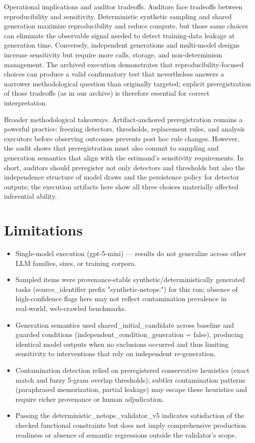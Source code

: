 \documentclass[conference]{IEEEtran}
\begin{document}
Operational implications and auditor tradeoffs. Auditors face tradeoffs between reproducibility and sensitivity. Deterministic synthetic sampling and shared generation maximize reproducibility and reduce compute, but those same choices can eliminate the observable signal needed to detect training‑data leakage at generation time. Conversely, independent generations and multi‑model designs increase sensitivity but require more calls, storage, and non‑determinism management. The archived execution demonstrates that reproducibility‑focused choices can produce a valid confirmatory test that nevertheless answers a narrower methodological question than originally targeted; explicit preregistration of those tradeoffs (as in our archive) is therefore essential for correct interpretation.

Broader methodological takeaways. Artifact‑anchored preregistration remains a powerful practice: freezing detectors, thresholds, replacement rules, and analysis executors before observing outcomes prevents post hoc rule changes. However, the audit shows that preregistration must also commit to sampling and generation semantics that align with the estimand's sensitivity requirements. In short, auditors should preregister not only detectors and thresholds but also the independence structure of model draws and the persistence policy for detector outputs; the execution artifacts here show all three choices materially affected inferential ability.

\section{Limitations}
\begin{itemize}
\item Single‑model execution (gpt‑5-mini) --- results do not generalize across other LLM families, sizes, or training corpora.
\item Sampled items were provenance‑stable synthetic/deterministically generated tasks (source\_identifier prefix "synthetic-netops:") for this run; absence of high‑confidence flags here may not reflect contamination prevalence in real‑world, web‑crawled benchmarks.
\item Generation semantics used shared\_initial\_candidate across baseline and guarded conditions (independent\_condition\_generation = false), producing identical model outputs when no exclusions occurred and thus limiting sensitivity to interventions that rely on independent re‑generation.
\item Contamination detection relied on preregistered conservative heuristics (exact match and fuzzy 5‑gram overlap thresholds); subtler contamination patterns (paraphrased memorization, partial leakage) may escape these heuristics and require richer provenance or human adjudication.
\item Passing the deterministic\_netops\_validator\_v5 indicates satisfaction of the checked functional constraints but does not imply comprehensive production readiness or absence of semantic regressions outside the validator's scope.
\end{itemize}
\end{document}
